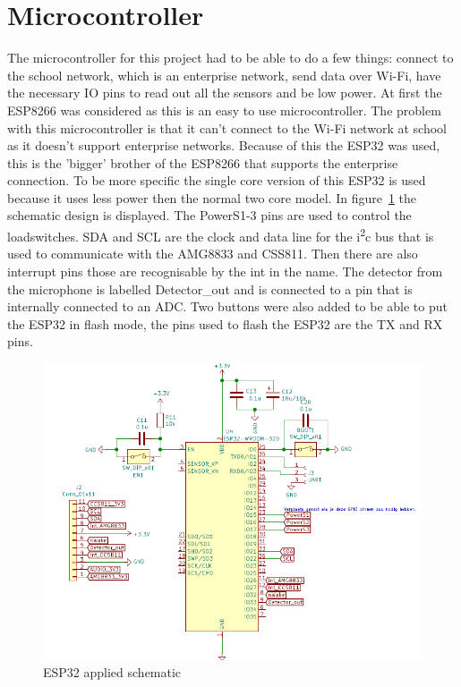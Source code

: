 \documentclass[11pt,a4paper]{article}
\begin{document}
\section{Microcontroller}
The microcontroller for this project had to be able to do a few things: connect to the school network, which is an enterprise network, send data over Wi-Fi, have the necessary IO pins to read out all the sensors and be low power.
At first the ESP8266 was considered as this is an easy to use microcontroller. The problem with this microcontroller is that it can't connect to the Wi-Fi network at school as it doesn't support enterprise networks.
Because of this the ESP32 was used, this is the 'bigger' brother of the ESP8266 that supports the enterprise connection. To be more specific the single core version of this ESP32 is used because it uses less power then the normal two core model.
In figure~\ref{fig:ESP32_toegepast} the schematic design is displayed. The PowerS1-3 pins are used to control the loadswitches. SDA and SCL are the clock and data line for the i\textsuperscript{2}c  bus that is used to communicate with the AMG8833 and CSS811.
Then there are also interrupt pins those are recognisable by the int in the name. The detector from the microphone is labelled Detector\_out and is connected to a pin that is internally connected to an ADC.
Two buttons were also added to be able to put the ESP32 in flash mode, the pins used to flash the ESP32 are the TX and RX pins. 
\begin{figure}[H]
	\centering
	\includegraphics[width=1.0\linewidth]{ESP32_toegepast.png}
	\caption{ESP32 applied schematic}
	\label{fig:ESP32_toegepast}
\end{figure}
\end{document}
